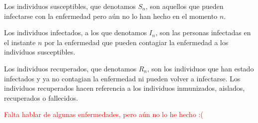\begin{definition}
Los individuos susceptibles, que denotamos $S_n$, son aquellos que pueden infectarse con la enfermedad pero aún no lo han hecho en el momento $n$.
\end{definition}

\begin{definition}
Los individuos infectados, a los que denotamos $I_n$, son las personas infectadas en el instante $n$ por la enfermedad que pueden contagiar la enfermedad a los individuos susceptibles.
\end{definition}

\begin{definition}
Los individuos recuperados, que denotamos $R_n$, son los individuos que han estado infectados y ya no contagian la enfermedad ni pueden volver a infectarse.
Los individuos recuperados hacen referencia a los individuos inmunizados, aislados, recuperados o fallecidos.
\end{definition}

\textcolor{red}{Falta hablar de algunas enfermedades, pero aún no lo he hecho :(}
